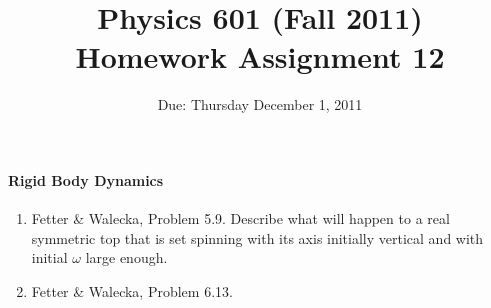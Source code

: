 \documentclass[letterpaper,11pt]{article}
\title{Physics 601 (Fall 2011) \\ Homework Assignment 12}
\date{Due: Thursday December 1, 2011}
\begin{document}
\maketitle

\paragraph*{Rigid Body Dynamics}
\begin{enumerate}
 \item Fetter \& Walecka, Problem 5.9.  Describe what will happen to a real symmetric top that is set spinning with its axis initially vertical and with initial $\omega$ large enough.
 \item Fetter \& Walecka, Problem 6.13.
\end{enumerate}
\end{document}
